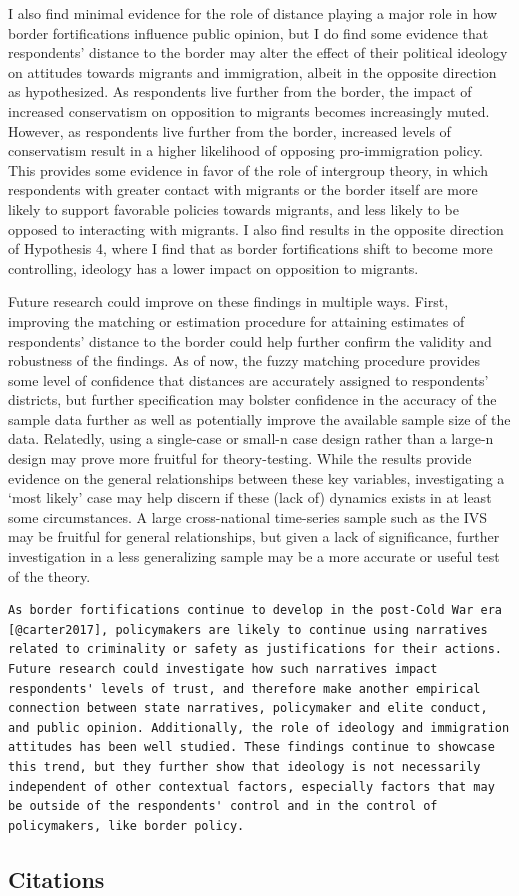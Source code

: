 \documentclass[12pt,]{article}
\begin{document}
I also find minimal evidence for the role of distance playing a major
role in how border fortifications influence public opinion, but I do
find some evidence that respondents' distance to the border may alter
the effect of their political ideology on attitudes towards migrants and
immigration, albeit in the opposite direction as hypothesized. As
respondents live further from the border, the impact of increased
conservatism on opposition to migrants becomes increasingly muted.
However, as respondents live further from the border, increased levels
of conservatism result in a higher likelihood of opposing
pro-immigration policy. This provides some evidence in favor of the role
of intergroup theory, in which respondents with greater contact with
migrants or the border itself are more likely to support favorable
policies towards migrants, and less likely to be opposed to interacting
with migrants. I also find results in the opposite direction of
Hypothesis 4, where I find that as border fortifications shift to become
more controlling, ideology has a lower impact on opposition to migrants.

Future research could improve on these findings in multiple ways. First,
improving the matching or estimation procedure for attaining estimates
of respondents' distance to the border could help further confirm the
validity and robustness of the findings. As of now, the fuzzy matching
procedure provides some level of confidence that distances are
accurately assigned to respondents' districts, but further specification
may bolster confidence in the accuracy of the sample data further as
well as potentially improve the available sample size of the data.
Relatedly, using a single-case or small-n case design rather than a
large-n design may prove more fruitful for theory-testing. While the
results provide evidence on the general relationships between these key
variables, investigating a `most likely' case may help discern if these
(lack of) dynamics exists in at least some circumstances. A large
cross-national time-series sample such as the IVS may be fruitful for
general relationships, but given a lack of significance, further
investigation in a less generalizing sample may be a more accurate or
useful test of the theory.

\begin{verbatim}
As border fortifications continue to develop in the post-Cold War era [@carter2017], policymakers are likely to continue using narratives related to criminality or safety as justifications for their actions. Future research could investigate how such narratives impact respondents' levels of trust, and therefore make another empirical connection between state narratives, policymaker and elite conduct, and public opinion. Additionally, the role of ideology and immigration attitudes has been well studied. These findings continue to showcase this trend, but they further show that ideology is not necessarily independent of other contextual factors, especially factors that may be outside of the respondents' control and in the control of policymakers, like border policy.
\end{verbatim}

\subsection{Citations}\label{citations}




\newpage
\singlespacing 

\end{document}
